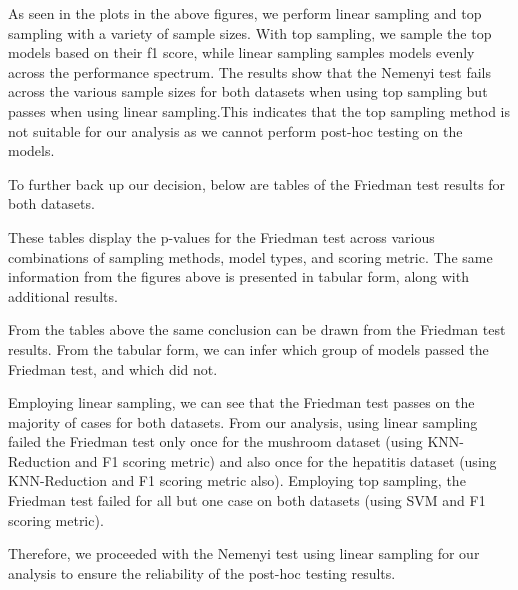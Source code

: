 As seen in the plots in the above figures, we perform linear sampling and top sampling with a variety
of sample sizes. With top sampling, we sample the top models based on their f1 score, while linear sampling samples models
evenly across the performance spectrum. The results show that the Nemenyi test fails across the various sample sizes for both datasets
when using top sampling but passes when using linear sampling.This indicates that the top sampling method is not suitable for our analysis
as we cannot perform post-hoc testing on the models.

To further back up our decision, below are tables of the Friedman test results for both datasets.




These tables display the p-values for the Friedman test across various combinations
of sampling methods, model types, and scoring metric. The same information from the figures 
above is presented in tabular form, along with additional results.

From the tables above the same conclusion can be drawn from the Friedman test results.
From the tabular form, we can infer which group of models passed the Friedman test, and which did not.

Employing linear sampling, we can see that the Friedman test passes on the majority
of cases for both datasets. From our analysis, using linear sampling failed the Friedman test
only once for the mushroom dataset (using KNN-Reduction and F1 scoring metric) and also once
for the hepatitis dataset (using KNN-Reduction and F1 scoring metric also). Employing top sampling,
the Friedman test failed for all but one case on both datasets (using SVM and F1 scoring metric).

Therefore, we proceeded with the Nemenyi test using linear sampling for our analysis to
ensure the reliability of the post-hoc testing results.